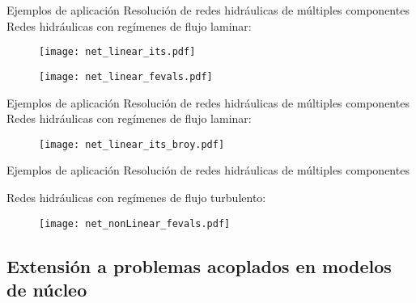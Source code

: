 \begin{frame}
{Ejemplos de aplicación}
{Resolución de redes hidráulicas de múltiples componentes}
Redes hidráulicas con regímenes de flujo laminar:

\begin{figure}[ht]
	\begin{minipage}{0.48\linewidth}
      \centering
      \texttt{[image: net\_linear\_its.pdf]}
	\end{minipage}
	\begin{minipage}{0.48\linewidth}
		\centering
		\texttt{[image: net\_linear\_fevals.pdf]}
	\end{minipage}
\end{figure}
\end{frame}
\begin{frame}
{Ejemplos de aplicación}
{Resolución de redes hidráulicas de múltiples componentes}
Redes hidráulicas con regímenes de flujo laminar:
\begin{figure}
\centering
\texttt{[image: net\_linear\_its\_broy.pdf]}
\end{figure}
\end{frame}

\begin{frame}
{Ejemplos de aplicación}
{Resolución de redes hidráulicas de múltiples componentes}

Redes hidráulicas con regímenes de flujo turbulento:

\begin{figure}[ht]
\centering
\texttt{[image: net\_nonLinear\_fevals.pdf]}
\end{figure}
\end{frame}





\subsection{Extensión a problemas acoplados en modelos de núcleo}

